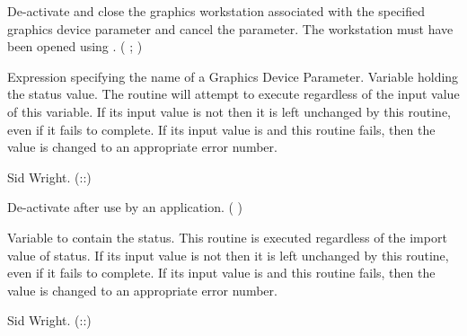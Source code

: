 \begin{manroutinedescription}
     De-activate and close the graphics workstation associated with
     the specified graphics device parameter and cancel the parameter.
     The workstation must have been opened using {}.
     {} {} ( {}; {} )
\begin{manparametertable}

           Expression specifying the name of a Graphics Device
           Parameter.
           Variable holding the status value.
           The routine will attempt to execute regardless of the input
           value of this variable.
           If its input value is not {} then it is left %
unchanged
           by this routine, even if it fails to complete.   If its
           input value is {} and this routine fails, then the
           value is changed to an appropriate error number.
\end{manparametertable}
     Sid Wright.  ({}::{})
\end{manroutinedescription}
\begin{manroutinedescription}
     De-activate {} {} after use by an application.
     {} {} ( {} )
\begin{manparametertable}
           Variable to contain the status. This routine is executed
           regardless of the import value of status.
           If its input value is not {} then it is left %
unchanged
           by this routine, even if it fails to complete.   If its
           input value is {} and this routine fails, then the
           value is changed to an appropriate error number.
\end{manparametertable}
     Sid Wright.  ({}::{})
\end{manroutinedescription}

\manrule
 

